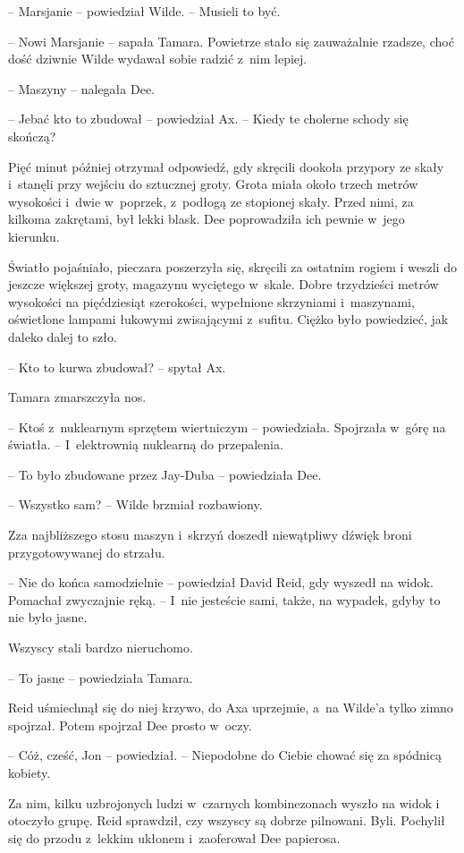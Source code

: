 \documentclass[oneside,polish,11pt,sfheadings]{mwbk}
\begin{document}
-- Marsjanie -- powiedział Wilde. -- Musieli to być.

-- Nowi Marsjanie -- sapała Tamara. Powietrze stało się zauważalnie
rzadsze, choć dość dziwnie Wilde wydawał sobie radzić z~nim lepiej.

-- Maszyny -- nalegała Dee.

-- Jebać kto to zbudował -- powiedział Ax. -- Kiedy te cholerne schody się
skończą?

Pięć minut później otrzymał odpowiedź, gdy skręcili dookoła przypory ze
skały i~stanęli przy wejściu do sztucznej groty. Grota miała około
trzech metrów wysokości i~dwie w~poprzek, z~podłogą ze stopionej skały.
Przed nimi, za kilkoma zakrętami, był lekki blask. Dee poprowadziła ich
pewnie w~jego kierunku.

Światło pojaśniało, pieczara poszerzyła się, skręcili za ostatnim rogiem
i weszli do jeszcze większej groty, magazynu wyciętego w~skale. Dobre
trzydzieści metrów wysokości na pięćdziesiąt szerokości, wypełnione
skrzyniami i~maszynami, oświetlone lampami łukowymi zwisającymi z~sufitu. Ciężko było powiedzieć, jak daleko dalej to szło.

-- Kto to kurwa zbudował? -- spytał Ax.

Tamara zmarszczyła nos. 

-- Ktoś z~nuklearnym sprzętem wiertniczym -- powiedziała. Spojrzała w~górę na światła. -- I~elektrownią nuklearną do
przepalenia.

-- To było zbudowane przez Jay-Duba -- powiedziała Dee.

-- Wszystko sam? -- Wilde brzmiał rozbawiony.

Zza najbliższego stosu maszyn i~skrzyń doszedł niewątpliwy dźwięk broni
przygotowywanej do strzału.

-- Nie do końca samodzielnie -- powiedział David Reid, gdy wyszedł na
widok. Pomachał zwyczajnie ręką. -- I~nie jesteście sami, także, na
wypadek, gdyby to nie było jasne.

Wszyscy stali bardzo nieruchomo.

-- To jasne -- powiedziała Tamara.

Reid uśmiechnął się do niej krzywo, do Axa uprzejmie, a~na Wilde'a tylko
zimno spojrzał. Potem spojrzał Dee prosto w~oczy.

-- Cóż, cześć, Jon -- powiedział. -- Niepodobne do Ciebie chować się za
spódnicą kobiety.

Za nim, kilku uzbrojonych ludzi w~czarnych kombinezonach wyszło na widok
i otoczyło grupę. Reid sprawdził, czy wszyscy są dobrze pilnowani. Byli.
Pochylił się do przodu z~lekkim ukłonem i~zaoferował Dee papierosa.
\end{document}
